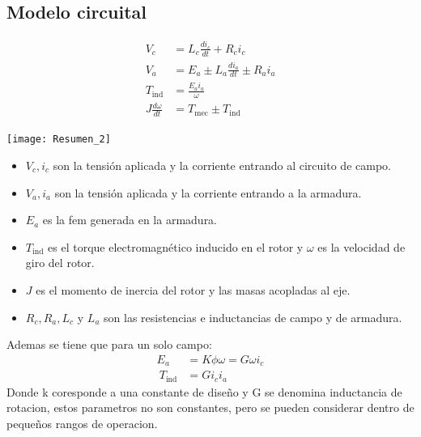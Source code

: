 \documentclass[
  11pt,
  letterpaper,
   addpoints,
   answers
  ]{exam}
\begin{document}
\subsection*{Modelo circuital}
\begin{minipage}{0.6\textwidth}
    \begin{align*}
        V_c &= L_c \frac{di_c}{dt} + R_c i_c \\
        V_a &= E_a \pm L_a \frac{di_a}{dt} \pm R_a i_a \\
        T_{\text{ind}} &= \frac{E_a i_a}{\omega} \\
        J \frac{d\omega}{dt} &= T_{\text{mec}} \pm T_{\text{ind}}
    \end{align*}
\end{minipage}%
\hfill
\begin{minipage}{0.45\textwidth} 
    \texttt{[image: Resumen\_2]} 
\end{minipage}
\begin{itemize}
  \item $V_c, i_c$ son la tensión aplicada y la corriente entrando al circuito de campo.
  \item $V_a, i_a$ son la tensión aplicada y la corriente entrando a la armadura.
  \item $E_a$ es la fem generada en la armadura.
  \item $T_{\text{ind}}$ es el torque electromagnético inducido en el rotor y $\omega$ es la velocidad de giro del rotor.
  \item $J$ es el momento de inercia del rotor y las masas acopladas al eje.
  \item $R_c, R_a, L_c$ y $L_a$ son las resistencias e inductancias de campo y de armadura.
\end{itemize}
Ademas se tiene que para un solo campo:
\begin{align}
  E_a &= K \phi \omega = G \omega i_{c}\\\
  T_{\text{ind}} &= G i_{c}i_{a}
\end{align}
Donde k coresponde a una constante de diseño y G se denomina inductancia de rotacion, estos parametros no son constantes, pero se pueden considerar dentro de pequeños rangos de operacion.
\end{document}
